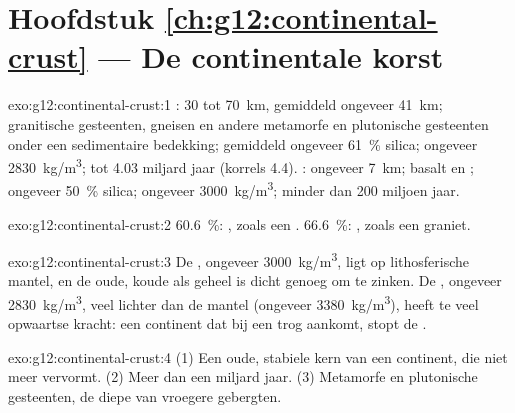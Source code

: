 \section*{Hoofdstuk \ref{ch:g12:continental-crust} --- De continentale korst}

\begin{solution}{exo:g12:continental-crust:1}
: 30 tot \qty{70}{km}, gemiddeld ongeveer \qty{41}{km};
granitische gesteenten, gneisen en andere metamorfe en plutonische gesteenten onder een
sedimentaire bedekking; gemiddeld ongeveer \qty{61}{\percent} silica; ongeveer
\qty{2830}{kg/m^3}; tot 4.03 miljard jaar (korrels 4.4). :
ongeveer \qty{7}{km}; basalt en ; ongeveer \qty{50}{\percent} silica; ongeveer
\qty{3000}{kg/m^3}; minder dan 200 miljoen jaar.
\end{solution}

\begin{solution}{exo:g12:continental-crust:2}
\qty{60.6}{\percent}: , zoals een . \qty{66.6}{\percent}:
, zoals een graniet.
\end{solution}

\begin{solution}{exo:g12:continental-crust:3}
De , ongeveer \qty{3000}{kg/m^3}, ligt op lithosferische mantel,
en de oude, koude  als geheel is dicht genoeg om te zinken.
De , ongeveer \qty{2830}{kg/m^3}, veel lichter dan de mantel
(ongeveer \qty{3380}{kg/m^3}), heeft te veel opwaartse kracht: een continent dat bij een trog aankomt,
stopt de .
\end{solution}

\begin{solution}{exo:g12:continental-crust:4}
(1) Een oude, stabiele kern van een continent, die niet meer vervormt. (2) Meer
dan een miljard jaar. (3) Metamorfe en plutonische gesteenten, de diepe  van
vroegere gebergten.
\end{solution}

